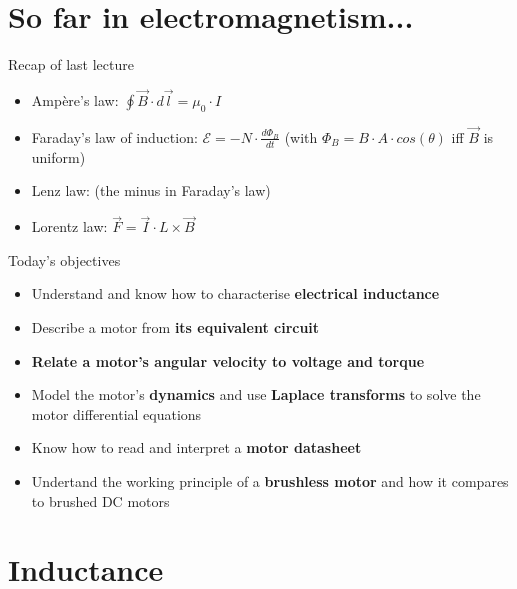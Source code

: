 \documentclass[compress]{beamer}
\makeatletter
\let\beamer@writeslidentry@miniframeson=\beamer@writeslidentry
\def\beamer@writeslidentry@miniframesoff{%
  \expandafter\beamer@ifempty\expandafter{\beamer@framestartpage}{}%
  {%
    \clearpage\beamer@notesactions%
  }
}
\newcommand*{\miniframeson}{\let\beamer@writeslidentry=\beamer@writeslidentry@miniframeson}
\newcommand*{\miniframesoff}{\let\beamer@writeslidentry=\beamer@writeslidentry@miniframesoff}
\makeatother
\begin{document}
\miniframeson




\miniframesoff

\section[]{So far in electromagnetism...}

\begin{frame}{Recap of last lecture}
    \begin{itemize}
        \item Ampère's law: $\displaystyle\oint \vec{B} \cdot d\vec{l} = \mu_0 \cdot I$
        \item Faraday's law of induction: $\displaystyle\mathcal{E} = -N \cdot
            \frac{d\Phi_B}{dt}$ (with $\Phi_B = B\cdot A \cdot cos(\theta)$ iff
            $\vec{B}$ is uniform)
        \item Lenz law: (the minus in Faraday's law)
        \item Lorentz law: $\displaystyle \vec{F} = \vec{I} \cdot L \times \vec{B}$
    \end{itemize}
\end{frame}

\begin{frame}{Today's objectives}

    \begin{itemize}
        \item Understand and know how to characterise \textbf{electrical inductance}
        \item Describe a motor from \textbf{its equivalent circuit}
        \item \textbf{Relate a motor's angular velocity to voltage and torque}
        \item Model the motor's \textbf{dynamics} and use \textbf{Laplace
            transforms} to solve the motor differential equations
        \item Know how to read and interpret a \textbf{motor datasheet}
        \item Undertand the working principle of a \textbf{brushless motor} and
            how it compares to brushed DC motors
    \end{itemize}
\end{frame}
\miniframeson



\section{Inductance}
\end{document}
